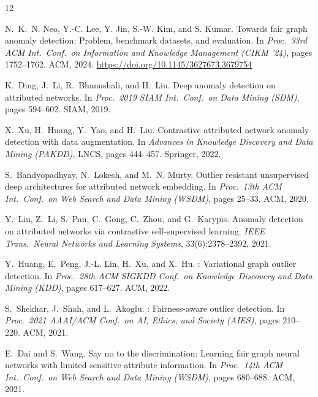 \documentclass[sigconf,natbib=false]{acmart}
\begin{document}
\begin{thebibliography}{12}

N.~K.~N. Neo, Y.-C. Lee, Y. Jin, S.-W. Kim, and S. Kumar.
\newblock Towards fair graph anomaly detection: Problem, benchmark datasets, and evaluation.
\newblock In \textit{Proc.\ 33rd ACM Int.\ Conf.\ on Information and Knowledge Management (CIKM '24)}, pages 1752--1762. ACM, 2024.
\newblock \url{https://doi.org/10.1145/3627673.3679754}

K.~Ding, J.~Li, R.~Bhanushali, and H.~Liu.
\newblock Deep anomaly detection on attributed networks.
\newblock In \textit{Proc.\ 2019 SIAM Int.\ Conf.\ on Data Mining (SDM)}, pages 594--602. SIAM, 2019.

X.~Xu, H.~Huang, Y.~Yao, and H.~Liu.
\newblock Contrastive attributed network anomaly detection with data augmentation.
\newblock In \textit{Advances in Knowledge Discovery and Data Mining (PAKDD)}, LNCS, pages 444--457. Springer, 2022.

S.~Bandyopadhyay, N.~Lokesh, and M.~N. Murty.
\newblock Outlier resistant unsupervised deep architectures for attributed network embedding.
\newblock In \textit{Proc.\ 13th ACM Int.\ Conf.\ on Web Search and Data Mining (WSDM)}, pages 25--33. ACM, 2020.

Y.~Liu, Z.~Li, S.~Pan, C.~Gong, C.~Zhou, and G.~Karypis.
\newblock Anomaly detection on attributed networks via contrastive self-supervised learning.
\newblock \textit{IEEE Trans.\ Neural Networks and Learning Systems}, 33(6):2378--2392, 2021.

Y.~Huang, E.~Peng, J.-L. Lin, H.~Xu, and X.~Hu.
: Variational graph outlier detection.
\newblock In \textit{Proc.\ 28th ACM SIGKDD Conf.\ on Knowledge Discovery and Data Mining (KDD)}, pages 617--627. ACM, 2022.

S.~Shekhar, J.~Shah, and L.~Akoglu.
: Fairness-aware outlier detection.
\newblock In \textit{Proc.\ 2021 AAAI/ACM Conf.\ on AI, Ethics, and Society (AIES)}, pages 210--220. ACM, 2021.

E.~Dai and S.~Wang.
\newblock Say no to the discrimination: Learning fair graph neural networks with limited sensitive attribute information.
\newblock In \textit{Proc.\ 14th ACM Int.\ Conf.\ on Web Search and Data Mining (WSDM)}, pages 680--688. ACM, 2021.


\end{thebibliography}
\end{document}
